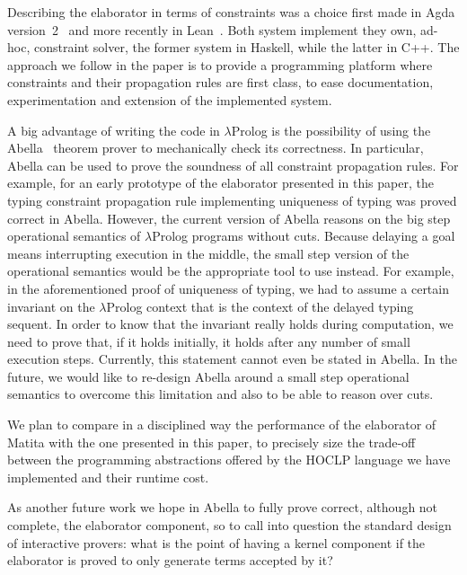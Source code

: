 \documentclass{easychair}
\begin{document}
Describing the elaborator in terms of constraints was a choice first 
made in Agda version~2~\cite{Agda} and more recently in Lean~\cite{Lean}.
Both system implement they own, ad-hoc, constraint solver, the former system in
Haskell, while the latter in C++.  The approach we follow in the paper
is to provide a programming platform where constraints and their propagation
rules are first class, to ease documentation, experimentation and extension
of the implemented system.

A big advantage of writing the code in $\lambda$Prolog is the possibility of
using the Abella~\cite{Abella} theorem prover to mechanically check
its correctness.
In particular, Abella can be used to prove the soundness of all constraint propagation rules. For example, for an early prototype of the elaborator presented
in this paper, the typing constraint propagation rule implementing uniqueness of
typing was proved correct in Abella. However, the current version of Abella reasons on the big step operational semantics of $\lambda$Prolog programs without cuts. Because delaying a goal means interrupting execution in the middle, the small step version of the operational semantics would be the appropriate tool to use instead. For example, in the aforementioned proof of uniqueness of typing, we had to assume a certain invariant on the $\lambda$Prolog context that is the context of the delayed typing sequent. In order to know that the invariant really holds during computation, we need to prove that, if it holds initially, it holds after any number of small execution steps. Currently, this statement cannot even be stated in Abella. In the future, we would like to re-design Abella around a small step operational semantics to overcome this limitation and also to be able to reason over cuts.

We plan to compare in a disciplined way the performance of the elaborator
of Matita with the one presented in this paper, to precisely size the
trade-off between the programming abstractions offered by the
HOCLP language we have implemented and their runtime cost.

As another future work we hope in Abella to fully prove correct, although not complete, the
elaborator component, so to call into question the standard design of
interactive provers: what is the point of having a kernel component if the
elaborator is proved to only generate terms accepted by it?

\label{sect:bib}


\end{document}
